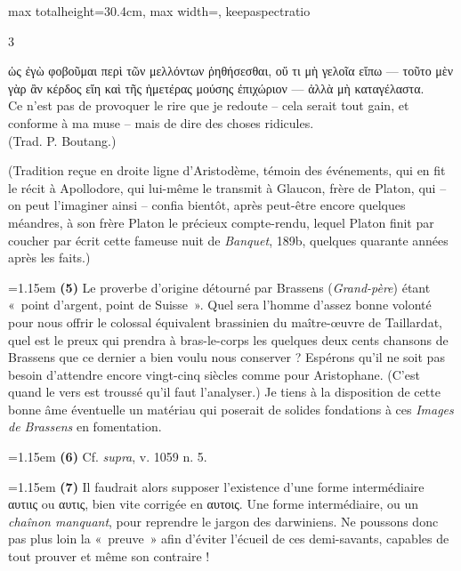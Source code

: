 \documentclass[11pt,twoside]{book}
\newcommand{\italique}[1]{\textit{#1}}
\newcommand{\citComm}[1]{\begin{quoting}[vskip=0.4pt,leftmargin=0.7em,rightmargin=0.2em]#1\end{quoting}}
\begin{document}
\begin{adjustbox}{max totalheight=30.4cm, max width=\textwidth, keepaspectratio}
\begin{minipage}{\textwidth}
{\begin{multicols}{3}
\citComm{ὡς ἐγὼ φοβοῦμαι περὶ τῶν μελλόντων ῥηθήσεσθαι, οὔ τι μὴ γελοῖα εἴπω — τοῦτο μὲν γὰρ ἂν κέρδος εἴη καὶ τῆς ἡμετέρας μούσης ἐπιχώριον — ἀλλὰ μὴ καταγέλαστα.\\
Ce n'est pas de provoquer le rire que je redoute -- cela serait tout gain, et conforme à ma muse -- mais de dire des choses ridicules.\\
(Trad. P. Boutang.)}
\par\vspace{1.5pt}
\noindent (Tradition reçue en droite ligne d'Aristodème, témoin des événements, qui en fit le récit à Apollodore, qui lui-même le transmit à Glaucon, frère de Platon, qui -- on peut l'imaginer ainsi -- confia bientôt, après peut-être encore quelques méandres, à son frère Platon le précieux compte-rendu, lequel Platon finit par coucher par écrit cette fameuse nuit de \italique{Banquet}, 189b, quelques quarante années après les faits.)
\par\vspace{1.5pt}
\noindent\hangindent=1.15em {\color{sepiaNote}\textbf{(5)}} Le proverbe d'origine détourné par Brassens (\italique{Grand-père}) étant «~point d'argent, point de Suisse~». Quel sera l'homme d'assez bonne volonté pour nous offrir le colossal équivalent brassinien du maître-œuvre de Taillardat, quel est le preux qui prendra à bras-le-corps les quelques deux cents chansons de Brassens que ce dernier a bien voulu nous conserver ? Espérons qu'il ne soit pas besoin d'attendre encore vingt-cinq siècles comme pour Aristophane. (C'est quand le vers est troussé qu'il faut l'analyser.) Je tiens à la disposition de cette bonne âme éventuelle un matériau qui poserait de solides fondations à ces \italique{Images de Brassens} en fomentation.
\par\vspace{1.5pt}
\noindent\hangindent=1.15em {\color{sepiaNote}\textbf{(6)}} Cf. \italique{supra}, v. 1059 n. 5.
\par\vspace{1.5pt}
\noindent\hangindent=1.15em {\color{sepiaNote}\textbf{(7)}} Il faudrait alors supposer l'existence d'une forme intermédiaire αυτιις ou αυτις, bien vite corrigée en αυτοις. Une forme intermédiaire, ou un \italique{chaînon manquant}, pour reprendre le jargon des darwiniens. Ne poussons donc pas plus loin la «~preuve~» afin d'éviter l'écueil de ces demi-savants, capables de tout prouver et même son contraire !
\par\vspace{1.5pt}

\end{multicols}}
\end{minipage}
\end{adjustbox}
\end{document}
